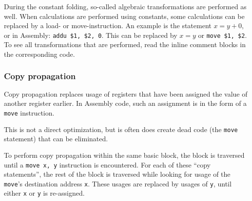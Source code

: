 \documentclass[10pt,a4paper]{article}
\begin{document}

During the constant folding, so-called algebraic transformations are performed
as well. When calculations are performed using constants, some calculations can
be replaced by a load- or move-instruction. An example is the statement
$x = y + 0$, or in Assembly: \texttt{addu \$1, \$2, 0}. This can be replaced by
$x = y$ or \texttt{move \$1, \$2}. To see all transformations that are
performed, read the inline comment blocks in the corresponding code.

\subsubsection{Copy propagation}

Copy propagation replaces usage of registers that have been assigned the value
of another register earlier. In Assembly code, such an assignment is in the
form of a \texttt{move} instruction.

This is not a direct optimization, but is often does create dead code (the
\texttt{move} statement) that can be eliminated.

To perform copy propagation within the same basic block, the block is traversed
until a \texttt{move x, y} instruction is encountered. For each of these ``copy
statements'', the rest of the block is traversed while looking for usage of the
\texttt{move}'s destination address \texttt{x}. These usages are replaced by
usages of \texttt{y}, until either \texttt{x} or \texttt{y} is re-assigned.

%
%
%
%
\end{document}
